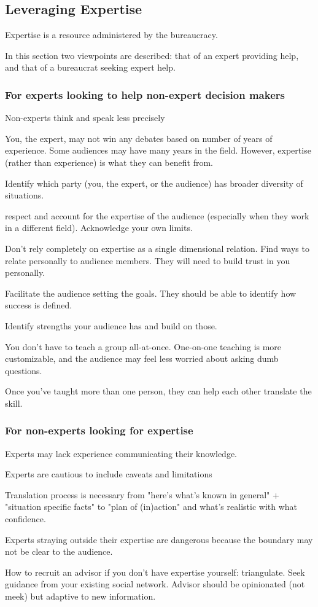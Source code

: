 \subsection{Leveraging Expertise}

Expertise is a resource administered by the bureaucracy.


In this section two viewpoints are described: that of an expert providing help, and that of a bureaucrat seeking expert help. 


\subsubsection{For experts looking to help non-expert decision makers}


Non-experts think and speak less precisely

You, the expert, may not win any debates based on number of years of experience. Some audiences may have many years in the field. However, expertise (rather than experience) is what they can benefit from. 

Identify which party (you, the expert, or the audience) has broader diversity of situations.

respect and account for the expertise of the audience (especially when they work in a different field). Acknowledge your own limits.

Don't rely completely on expertise as a single dimensional relation. Find ways to relate personally to audience members. They will need to build trust in you personally.

Facilitate the audience setting the goals. They should be able to identify how success is defined.

Identify strengths your audience has and build on those.

You don't have to teach a group all-at-once. One-on-one teaching is more customizable, and the audience may feel less worried about asking dumb questions.

Once you've taught more than one person, they can help each other translate the skill. 

\subsubsection{For non-experts looking for expertise}

Experts may lack experience communicating their knowledge. 

Experts are cautious to include caveats and limitations

Translation process is necessary from "here's what's known in general" + "situation specific facts" to "plan of (in)action" and what's realistic with what confidence. 

Experts straying outside their expertise are dangerous because the boundary may not be clear to the audience.



How to recruit an advisor if you don't have expertise yourself: triangulate. Seek guidance from your existing social network. Advisor should be opinionated (not meek) but adaptive to new information. 